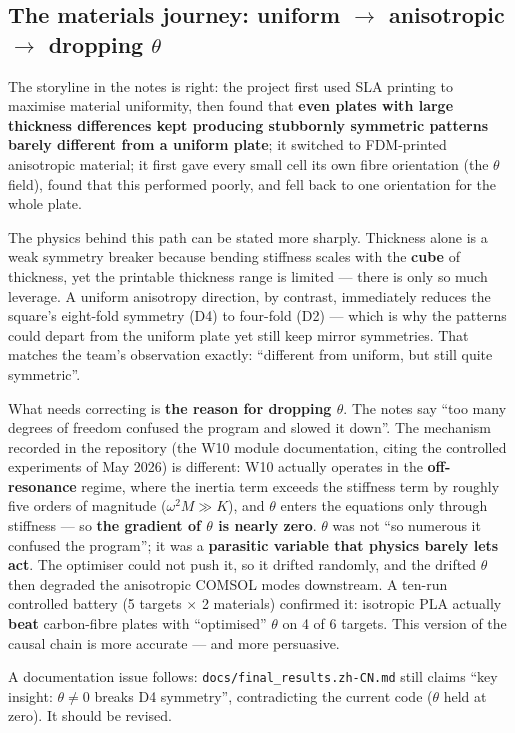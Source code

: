 \documentclass[11pt,a4paper]{article}
\newcommand{\code}[1]{\texttt{#1}}
\begin{document}
\subsection{The materials journey: uniform $\rightarrow$ anisotropic $\rightarrow$ dropping $\theta$}

The storyline in the notes is right: the project first used SLA printing to maximise material uniformity, then found that \textbf{even plates with large thickness differences kept producing stubbornly symmetric patterns barely different from a uniform plate}; it switched to FDM-printed anisotropic material; it first gave every small cell its own fibre orientation (the $\theta$ field), found that this performed poorly, and fell back to one orientation for the whole plate.

The physics behind this path can be stated more sharply. Thickness alone is a weak symmetry breaker because bending stiffness scales with the \textbf{cube} of thickness, yet the printable thickness range is limited --- there is only so much leverage. A uniform anisotropy direction, by contrast, immediately reduces the square's eight-fold symmetry (D4) to four-fold (D2) --- which is why the patterns could depart from the uniform plate yet still keep mirror symmetries. That matches the team's observation exactly: ``different from uniform, but still quite symmetric''.

What needs correcting is \textbf{the reason for dropping $\theta$}. The notes say ``too many degrees of freedom confused the program and slowed it down''. The mechanism recorded in the repository (the W10 module documentation, citing the controlled experiments of May 2026) is different: W10 actually operates in the \textbf{off-resonance} regime, where the inertia term exceeds the stiffness term by roughly five orders of magnitude ($\omega^2 M \gg K$), and $\theta$ enters the equations only through stiffness --- so \textbf{the gradient of $\theta$ is nearly zero}. $\theta$ was not ``so numerous it confused the program''; it was a \textbf{parasitic variable that physics barely lets act}. The optimiser could not push it, so it drifted randomly, and the drifted $\theta$ then degraded the anisotropic COMSOL modes downstream. A ten-run controlled battery (5 targets $\times$ 2 materials) confirmed it: isotropic PLA actually \textbf{beat} carbon-fibre plates with ``optimised'' $\theta$ on 4 of 6 targets. This version of the causal chain is more accurate --- and more persuasive.

A documentation issue follows: \code{docs/final\_results.zh-CN.md} still claims ``key insight: $\theta\neq 0$ breaks D4 symmetry'', contradicting the current code ($\theta$ held at zero). It should be revised.
\end{document}
